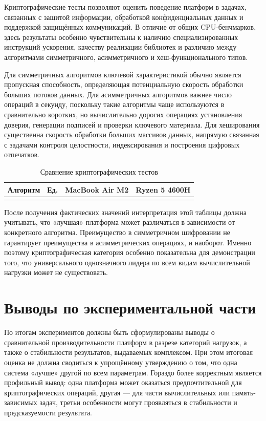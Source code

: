 Криптографические тесты позволяют оценить поведение платформ в задачах, связанных с защитой информации, обработкой конфиденциальных данных и поддержкой защищённых коммуникаций. В отличие от общих CPU-бенчмарков, здесь результаты особенно чувствительны к наличию специализированных инструкций ускорения, качеству реализации библиотек и различию между алгоритмами симметричного, асимметричного и хеш-функционального типов.

Для симметричных алгоритмов ключевой характеристикой обычно является пропускная способность, определяющая потенциальную скорость обработки больших потоков данных. Для асимметричных алгоритмов важнее число операций в секунду, поскольку такие алгоритмы чаще используются в сравнительно коротких, но вычислительно дорогих операциях установления доверия, генерации подписей и проверки ключевого материала. Для хеширования существенна скорость обработки больших массивов данных, напрямую связанная с задачами контроля целостности, индексирования и построения цифровых отпечатков.

\begin{table}[!htbp]
\centering
\caption{Сравнение криптографических тестов}
\label{tab:crypto_compare}
\begin{tabular}{|l|c|c|c|}
\hline
\textbf{Алгоритм} & \textbf{Ед.} & \textbf{MacBook Air M2} & \textbf{Ryzen 5 4600H} \\
\hline
 &  &  &  \\
\hline
\end{tabular}
\end{table}

\noindent После получения фактических значений интерпретация этой таблицы должна учитывать, что «лучшая» платформа может различаться в зависимости от конкретного алгоритма. Преимущество в симметричном шифровании не гарантирует преимущества в асимметрических операциях, и наоборот. Именно поэтому криптографическая категория особенно показательна для демонстрации того, что универсального однозначного лидера по всем видам вычислительной нагрузки может не существовать.

\section{Выводы по экспериментальной части}

По итогам экспериментов должны быть сформулированы выводы о сравнительной производительности платформ в разрезе категорий нагрузок, а также о стабильности результатов, выдаваемых комплексом. При этом итоговая оценка не должна сводиться к упрощённому утверждению о том, что одна система «лучше» другой по всем параметрам. Гораздо более корректным является профильный вывод: одна платформа может оказаться предпочтительной для криптографических операций, другая --- для части вычислительных или память-зависимых задач, третьи особенности могут проявляться в стабильности и предсказуемости результата.

